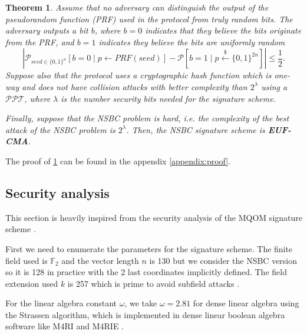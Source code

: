 \documentclass[english]{article}
\newtheorem{theorem}{Theorem}[section]
\begin{document}
		\begin{theorem}\label{EUF-CMA}
			Assume that no adversary can distinguish the output of the pseudorandom function (PRF) used in the protocol from truly random bits. The adversary outputs a bit $b$, where $b=0$ indicates that they believe the bits originate from the PRF, and $b=1$ indicates they believe the bits are uniformly random
			$$
				| \mathcal{P}_{seed \in \{0,1\}^n}[b=0 \mid p \leftarrow PRF(seed)] - \mathcal{P}[b=1 \mid p \overset{{\scriptscriptstyle\$}}{\leftarrow} \{0,1\}^{2n}] | \leq \frac{1}{2}.
			$$
			Suppose also that the protocol uses a cryptographic hash function which is one-way and does not have collision attacks with better complexity than $2^{\lambda}$ using a $\mathcal{PPT}$, where $\lambda$ is the number security bits needed for the signature scheme.
			
			Finally, suppose that the NSBC problem is hard, i.e. the complexity of the best attack of the NSBC problem is $2^{\lambda}$.
			Then, the NSBC signature scheme is \textbf{EUF-CMA}.
		\end{theorem}
		The proof of \ref{EUF-CMA} can be found in the appendix \ref{appendix:proof}.
		
		\subsection{Security analysis}
		This section is heavily inspired from the security analysis of the MQOM signature scheme \cite{MQOMv2}.

		First we need to enumerate the parameters for the signature scheme. The finite field used is $\mathbb{F}_2$ and the vector length $n$ is 130 but we consider the NSBC version so it is 128 in practice with the 2 last coordinates implicitly defined. The field extension used $k$ is 257 which is prime to avoid subfield attacks \cite{Peb24}.
		
		For the linear algebra constant $\omega$, we take $\omega = 2.81$ for dense linear algebra using the Strassen algorithm, which is implemented in dense linear boolean algebra software like M4RI and M4RIE \cite{M4RI}.
		
\end{document}
